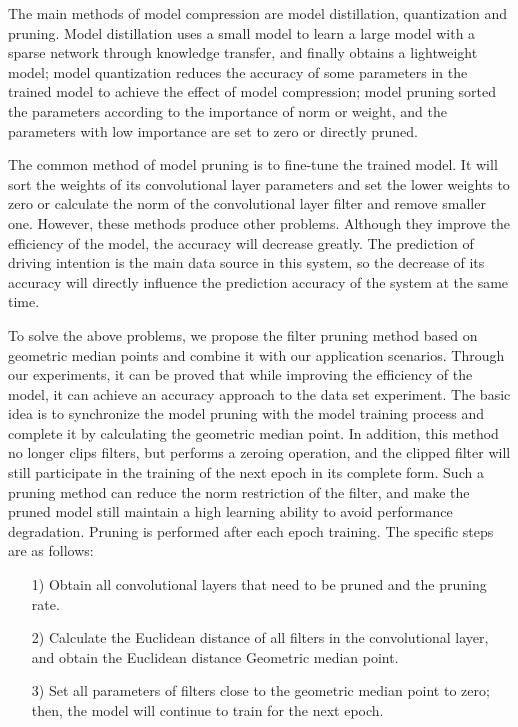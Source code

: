 \documentclass[journal]{IEEEtran}
\begin{document}
The main methods of model compression are model distillation, quantization and pruning. Model distillation uses a small model to learn a large model with a sparse network through knowledge transfer, and finally obtains a lightweight model; model quantization reduces the accuracy of some parameters in the trained model to achieve the effect of model compression; model pruning sorted the parameters according to the importance of norm or weight, and the parameters with low importance are set to zero or directly pruned.

The common method of model pruning is to fine-tune the trained model. It will sort the weights of its convolutional layer parameters and set the lower weights to zero or calculate the norm of the convolutional layer filter and remove smaller one. However, these methods produce other problems. Although they improve the efficiency of the model, the accuracy will decrease greatly. The prediction of driving intention is the main data source in this system, so the decrease of its accuracy will directly influence the prediction accuracy of the system at the same time.

To solve the above problems, we propose the filter pruning method based on geometric median points and combine it with our application scenarios. Through our experiments, it can be proved that while improving the efficiency of the model, it can achieve an accuracy approach to the data set experiment. The basic idea is to synchronize the model pruning with the model training process and complete it by calculating the geometric median point. In addition, this method no longer clips filters, but performs a zeroing operation, and the clipped filter will still participate in the training of the next epoch in its complete form. Such a pruning method can reduce the norm restriction of the filter, and make the pruned model still maintain a high learning ability to avoid performance degradation. Pruning is performed after each epoch training. The specific steps are as follows: 
\begin{itemize}
  \item [1)] 
  Obtain all convolutional layers that need to be pruned and the pruning rate.       
  \item [2)]
  Calculate the Euclidean distance of all filters in the convolutional layer, and obtain the Euclidean distance Geometric median point. 
  \item [3)]
  Set all parameters of filters close to the geometric median point to zero; then, the model will continue to train for the next epoch.
\end{itemize}
\end{document}
